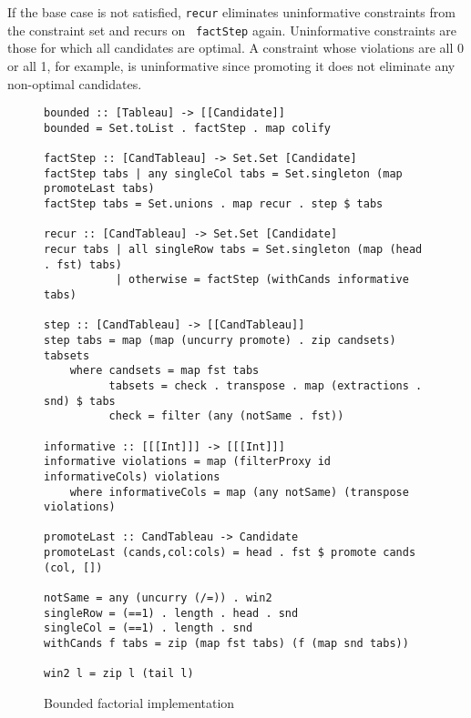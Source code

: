 \documentclass[11pt]{article}
\begin{document}
If the base case is not satisfied, {\tt recur} eliminates
uninformative constraints from the constraint set and recurs on {\tt
  factStep} again. Uninformative constraints are those for which all
candidates are optimal. A constraint whose violations are all 0 or all
1, for example, is uninformative since promoting it does not eliminate
any non-optimal candidates.

  \begin{figure}
    \centering
    \begin{verbatim}
bounded :: [Tableau] -> [[Candidate]]
bounded = Set.toList . factStep . map colify

factStep :: [CandTableau] -> Set.Set [Candidate]
factStep tabs | any singleCol tabs = Set.singleton (map promoteLast tabs)
factStep tabs = Set.unions . map recur . step $ tabs

recur :: [CandTableau] -> Set.Set [Candidate]
recur tabs | all singleRow tabs = Set.singleton (map (head . fst) tabs)
           | otherwise = factStep (withCands informative tabs)

step :: [CandTableau] -> [[CandTableau]]
step tabs = map (map (uncurry promote) . zip candsets) tabsets
    where candsets = map fst tabs
          tabsets = check . transpose . map (extractions . snd) $ tabs
          check = filter (any (notSame . fst))

informative :: [[[Int]]] -> [[[Int]]]
informative violations = map (filterProxy id informativeCols) violations
    where informativeCols = map (any notSame) (transpose violations)

promoteLast :: CandTableau -> Candidate
promoteLast (cands,col:cols) = head . fst $ promote cands (col, [])

notSame = any (uncurry (/=)) . win2
singleRow = (==1) . length . head . snd
singleCol = (==1) . length . snd
withCands f tabs = zip (map fst tabs) (f (map snd tabs))

win2 l = zip l (tail l)
\end{verbatim}
    \caption{Bounded factorial implementation}
    \label{haskell-bounded-factorial}
  \end{figure}

\end{document}
